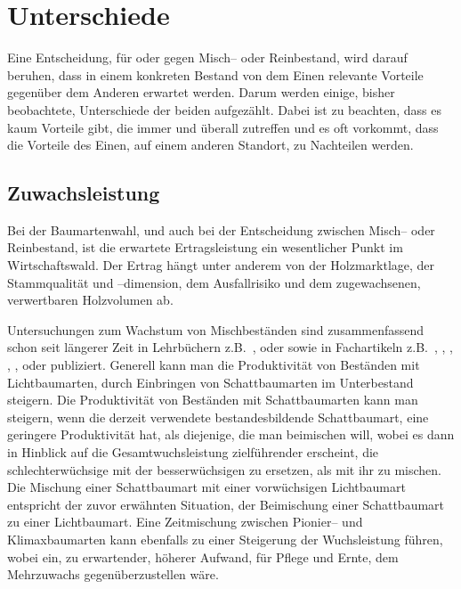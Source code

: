 \documentclass[twocolumn]{scrartcl}
\begin{document}
\section{Unterschiede}
\label{sec:unterschiede}

Eine Entscheidung, für oder gegen Misch-- oder Reinbestand, wird
darauf beruhen, dass in einem konkreten Bestand von dem Einen
relevante Vorteile gegenüber dem Anderen erwartet werden. Darum werden
einige, bisher beobachtete, Unterschiede der beiden aufgezählt. Dabei
ist zu beachten, dass es kaum Vorteile gibt, die immer und überall
zutreffen und es oft vorkommt, dass die Vorteile des Einen, auf einem
anderen Standort, zu Nachteilen werden.

\subsection{Zuwachsleistung}
\label{ssec:zuwachs}

Bei der Baumartenwahl, und auch bei der Entscheidung zwischen Misch--
oder Reinbestand, ist die erwartete Ertragsleistung ein wesentlicher
Punkt im Wirtschaftswald. Der Ertrag hängt unter anderem von der
Holzmarktlage, der Stammqualität und --dimension, dem Ausfallrisiko
und dem zugewachsenen, verwertbaren Holzvolumen ab.

Untersuchungen zum Wachstum von Mischbeständen sind zusammenfassend schon seit
längerer Zeit in Lehrbüchern z.B.\ \cite{wiedemann1951Ertragskunde},
\cite{assmann1961Waldertraskunde} oder \cite{mitscherlich1978WaldWachstumUmwelt}
sowie in Fachartikeln z.B.\ \cite{baader1942WasLeistetDerMischbestand},
\cite{kennel1965MischbestandFichteBuche},
\cite{mitscherlich196566ReinUndMischbestand}, \cite{guericke2001mischungBuLae},
\cite{pretzsch2003mischwald}, \cite{bauhus2004mischung} oder
\cite{kelty2006mischwald} publiziert. Generell kann man die Produktivität von
Beständen mit Lichtbaumarten, durch Einbringen von Schattbaumarten im
Unterbestand steigern. Die Produktivität von Beständen mit Schattbaumarten kann
man steigern, wenn die derzeit verwendete bestandesbildende Schattbaumart, eine
geringere Produktivität hat, als diejenige, die man beimischen will, wobei es
dann in Hinblick auf die Gesamtwuchsleistung zielführender erscheint, die
schlechterwüchsige mit der besserwüchsigen zu ersetzen, als mit ihr zu mischen.
Die Mischung einer Schattbaumart mit einer vorwüchsigen Lichtbaumart entspricht
der zuvor erwähnten Situation, der Beimischung einer Schattbaumart zu einer
Lichtbaumart. Eine Zeitmischung zwischen Pionier-- und Klimaxbaumarten kann
ebenfalls zu einer Steigerung der Wuchsleistung führen, wobei ein, zu
erwartender, höherer Aufwand, für Pflege und Ernte, dem Mehrzuwachs
gegenüberzustellen wäre.
\end{document}
